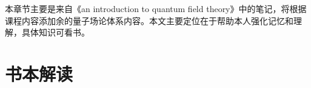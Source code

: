 \documentclass[lang=cn,chinesefont = nofont ,10pt,scheme=chinese]{elegantbook}
\begin{document}
\maketitle
\frontmatter
\tableofcontents
\mainmatter
本章节主要是来自《an introduction to quantum field theory》中的笔记，将根据课程内容添加余的量子场论体系内容。本文主要定位在于帮助本人强化记忆和理解，具体知识可看书。

\part{书本解读}

\end{document}
